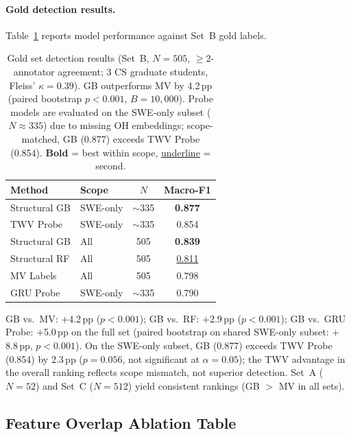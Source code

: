 \paragraph{Gold detection results.}
Table~\ref{tab:gold_batch1} reports model performance against Set~B gold labels.

\begin{table}[h]
\centering
\small
\begin{tabular}{llcc}
\toprule
\textbf{Method} & \textbf{Scope} & $N$ & \textbf{Macro-F1} \\
\midrule
Structural GB   & SWE-only & ${\sim}$335 & \textbf{0.877} \\
TWV Probe       & SWE-only & ${\sim}$335 & 0.854 \\
\midrule
Structural GB   & All      & 505 & \textbf{0.839} \\
Structural RF   & All      & 505 & \underline{0.811} \\
MV Labels       & All      & 505 & 0.798 \\
GRU Probe       & SWE-only & ${\sim}$335 & 0.790 \\
\bottomrule
\end{tabular}
\caption{Gold set detection results (Set~B, $N{=}505$, ${\geq}$2-annotator agreement; 3 CS graduate students, Fleiss' $\kappa{=}0.39$). GB outperforms MV by 4.2\,pp (paired bootstrap $p{<}0.001$, $B{=}10{,}000$). Probe models are evaluated on the SWE-only subset ($N{\approx}335$) due to missing OH embeddings; scope-matched, GB (0.877) exceeds TWV Probe (0.854). \textbf{Bold} = best within scope, \underline{underline} = second.}
\label{tab:gold_batch1}
\end{table}

GB vs.\ MV: $+$4.2\,pp ($p{<}0.001$); GB vs.\ RF: $+$2.9\,pp ($p{<}0.001$); GB vs.\ GRU Probe: $+$5.0\,pp on the full set (paired bootstrap on shared SWE-only subset: $+$8.8\,pp, $p{<}0.001$).
On the SWE-only subset, GB (0.877) exceeds TWV Probe (0.854) by 2.3\,pp ($p{=}0.056$, not significant at $\alpha{=}0.05$); the TWV advantage in the overall ranking reflects scope mismatch, not superior detection.
Set~A ($N{=}52$) and Set~C ($N{=}512$) yield consistent rankings (GB $>$ MV in all sets).

\subsection{Feature Overlap Ablation Table}
\label{sec:app_feature_overlap}

